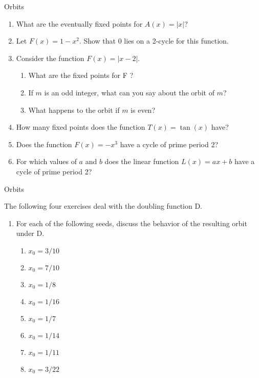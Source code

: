 \begin{frame}{Orbits}

\begin{enumerate}
\item What are the eventually fixed points for $A(x) = |x|$?
\item Let $F(x) = 1 -x^2$. Show that 0 lies on a 2-cycle for this function.
\item Consider the function $F(x) = |x - 2|$.

  \begin{enumerate}
  \item What are the fixed points for F ?
  \item If $m$ is an odd integer, what can you say about the orbit of $m$?
  \item What happens to the orbit if $m$ is even?
  \end{enumerate}

\item How many fixed points does the function $T(x) = \tan(x)$ have?
\item Does the function $F(x) = -x^3$ have a cycle of prime period 2?
\item For which values of $a$ and $b$ does the linear function $L(x) = ax + b$ have a cycle of prime period 2?
\end{enumerate}

\end{frame}


\begin{frame}{Orbits}

The following four exercises deal with the doubling function D.

\begin{enumerate}

\item For each of the following seeds, discuss the behavior of the resulting orbit
under D.

  \begin{enumerate}
  \item $x_0 = 3/10$
  \item $x_0 = 7/10$
  \item $x_0 = 1/8$
  \item $x_0 = 1/16$
  \item $x_0 = 1/7$
  \item $x_0 = 1/14$
  \item $x_0 = 1/11$
  \item $x_0 = 3/22$
  \end{enumerate}
\end{enumerate}  

\end{frame}


